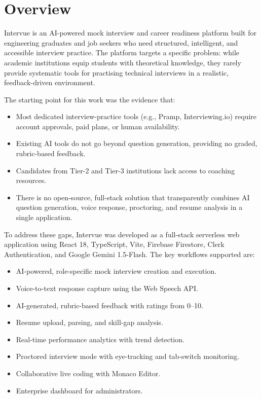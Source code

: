 \documentclass{fisatprojectfinal}
\begin{document}
\section{Overview}
Intervue is an AI-powered mock interview and career readiness platform built for engineering
graduates and job seekers who need structured, intelligent, and accessible interview practice.
The platform targets a specific problem: while academic institutions equip students with
theoretical knowledge, they rarely provide systematic tools for practising technical interviews
in a realistic, feedback-driven environment.

The starting point for this work was the evidence that:
\begin{itemize}
  \item Most dedicated interview-practice tools (e.g., Pramp, Interviewing.io) require account
        approvals, paid plans, or human availability.
  \item Existing AI tools do not go beyond question generation, providing no graded,
        rubric-based feedback.
  \item Candidates from Tier-2 and Tier-3 institutions lack access to coaching resources.
  \item There is no open-source, full-stack solution that transparently combines AI question
        generation, voice response, proctoring, and resume analysis in a single application.
\end{itemize}

To address these gaps, Intervue was developed as a full-stack serverless web application using
React 18, TypeScript, Vite, Firebase Firestore, Clerk Authentication, and Google Gemini
1.5-Flash. The key workflows supported are:
\begin{itemize}
  \item AI-powered, role-specific mock interview creation and execution.
  \item Voice-to-text response capture using the Web Speech API.
  \item AI-generated, rubric-based feedback with ratings from 0--10.
  \item Resume upload, parsing, and skill-gap analysis.
  \item Real-time performance analytics with trend detection.
  \item Proctored interview mode with eye-tracking and tab-switch monitoring.
  \item Collaborative live coding with Monaco Editor.
  \item Enterprise dashboard for administrators.
\end{itemize}
\end{document}

